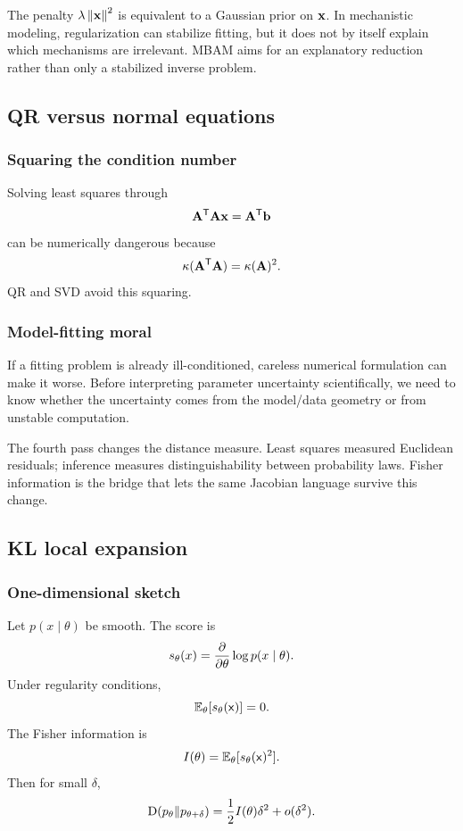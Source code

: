 The penalty \(\lambda\left\lVert \mathbf{x}\right\rVert^2\) is equivalent to a Gaussian prior on \(\mathbf{x}\).  In mechanistic modeling, regularization can stabilize fitting, but it does not by itself explain which mechanisms are irrelevant.  MBAM aims for an explanatory reduction rather than only a stabilized inverse problem.

\subsection{QR versus normal equations}

\subsubsection*{Squaring the condition number}

Solving least squares through
\[
  \mathbf{A}^{\mathsf{T}}\mathbf{A}\mathbf{x}
  =
  \mathbf{A}^{\mathsf{T}}\mathbf{b}
\]
can be numerically dangerous because
\[
  \kappa(\mathbf{A}^{\mathsf{T}}\mathbf{A})=\kappa(\mathbf{A})^2.
\]
QR and SVD avoid this squaring.

\subsubsection*{Model-fitting moral}

If a fitting problem is already ill-conditioned, careless numerical formulation can make it worse.  Before interpreting parameter uncertainty scientifically, we need to know whether the uncertainty comes from the model/data geometry or from unstable computation.

\noindent
The fourth pass changes the distance measure.  Least squares measured Euclidean residuals; inference measures distinguishability between probability laws.  Fisher information is the bridge that lets the same Jacobian language survive this change.

\subsection{KL local expansion}

\subsubsection*{One-dimensional sketch}

Let \(p(x\mid\theta)\) be smooth.  The score is
\[
  s_\theta(x)=\frac{\partial }{\partial \theta}\log p(x\mid\theta).
\]
Under regularity conditions,
\[
  \mathbb{E}_\theta[s_\theta(\mathsf{x})]=0.
\]
The Fisher information is
\[
  I(\theta)=\mathbb{E}_\theta[s_\theta(\mathsf{x})^2].
\]
Then for small \(\delta\),
\[
  \operatorname{D}(p_\theta\|p_{\theta+\delta})
  =
  \frac{1}{2}I(\theta)\delta^2+o(\delta^2).
\]

